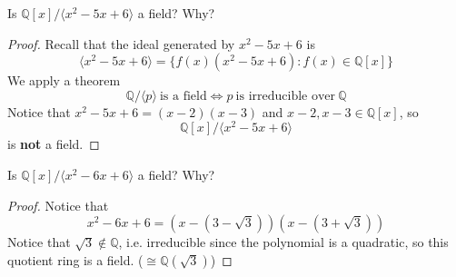 \begin{prob}
    Is $\mathbb Q[x]/\langle x^2 - 5x + 6\rangle$ a field? Why?
\end{prob}
\begin{proof}
    Recall that the ideal generated by $x^2 - 5x + 6$ is 
    \[
        \langle x^2 -5x + 6\rangle = \{f(x) (x^2 - 5x + 6) : 
        f(x) \in \mathbb Q[x]\}
    \]
    We apply a theorem 
    \[
        \mathbb Q/\langle p \rangle \ \text{is a field} 
        \Leftrightarrow
        p \ \text{is irreducible over} \ \mathbb Q
    \]
    Notice that $x^2 - 5x + 6 = (x-2)(x-3)$ and 
    $x-2,x-3 \in \mathbb Q[x]$, so 
    \[
        \mathbb Q[x]/\langle x^2 - 5x + 6 \rangle
    \]
    is \textbf{not} a field.
\end{proof}
\begin{prob}
    Is $\mathbb Q[x]/\langle x^2 - 6x + 6\rangle$ a field? Why?
\end{prob}
\begin{proof}
    Notice that 
    \[
        x^2 - 6x + 6 = (x-(3-\sqrt 3))(x-(3+\sqrt 3))
    \]
    Notice that $\sqrt 3 \not\in \mathbb Q$, i.e. irreducible since 
    the polynomial is a quadratic, 
    so this quotient ring 
    is a field. ($\cong \mathbb Q(\sqrt 3)$)
\end{proof}

\newpage 

